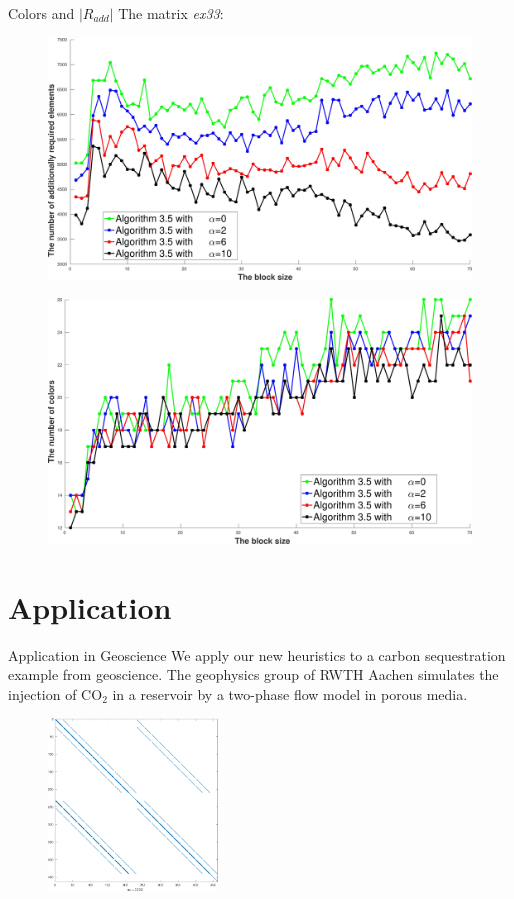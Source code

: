 \documentclass{beamer}
\begin{document}
\begin{frame}{Colors and $|R_{add}|$}
The matrix \textit{ex33}:
\begin{figure}
\centering
\includegraphics[width=0.5\linewidth]{ex33_alg35_alpha_0_2_6_10_bls_lfo_adds}
\end{figure}

\begin{figure}
\centering
\includegraphics[width=0.5\linewidth]{ex33_alg35_alpha_0_2_6_10_bls_lfo_cols}
\end{figure}
\end{frame}

\section{Application}
\begin{frame}{Application in Geoscience}
We apply our new heuristics to a carbon sequestration example from geoscience.
The geophysics group of RWTH Aachen simulates the injection of CO$_2$ in a reservoir by a
two-phase flow model in porous media.
\begin{figure}
\centering
\includegraphics[width=0.4\textwidth]{co2_jac}
\end{figure}
\end{frame}
\end{document}
